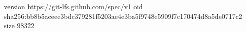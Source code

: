 version https://git-lfs.github.com/spec/v1
oid sha256:bb8b5aceee3bdc379281f5203ae4e3ba5f9748e5909f7c170474d8a5de0717c2
size 98322

